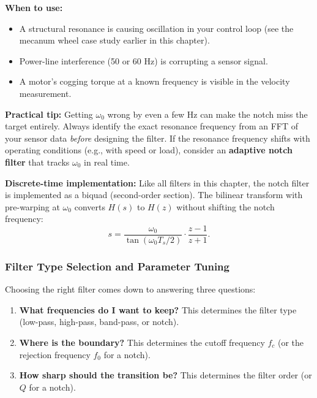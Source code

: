 \textbf{When to use:}
\begin{itemize}[nosep]
    \item A structural resonance is causing oscillation in your control loop (see the mecanum wheel case study earlier in this chapter).
    \item Power-line interference (50 or 60 Hz) is corrupting a sensor signal.
    \item A motor's cogging torque at a known frequency is visible in the velocity measurement.
\end{itemize}

\textbf{Practical tip:} Getting $\omega_0$ wrong by even a few Hz can make the notch miss the target entirely. Always identify the exact resonance frequency from an FFT of your sensor data \textit{before} designing the filter. If the resonance frequency shifts with operating conditions (e.g., with speed or load), consider an \textbf{adaptive notch filter} that tracks $\omega_0$ in real time.

\textbf{Discrete-time implementation:} Like all filters in this chapter, the notch filter is implemented as a biquad (second-order section). The bilinear transform with pre-warping at $\omega_0$ converts $H(s)$ to $H(z)$ without shifting the notch frequency:
\[
s = \frac{\omega_0}{\tan(\omega_0 T_s / 2)} \cdot \frac{z - 1}{z + 1}.
\]

\subsubsection{Filter Type Selection and Parameter Tuning}

Choosing the right filter comes down to answering three questions:
\begin{enumerate}
    \item \textbf{What frequencies do I want to keep?} This determines the filter type (low-pass, high-pass, band-pass, or notch).
    \item \textbf{Where is the boundary?} This determines the cutoff frequency $f_c$ (or the rejection frequency $f_0$ for a notch).
    \item \textbf{How sharp should the transition be?} This determines the filter order (or $Q$ for a notch).
\end{enumerate}

